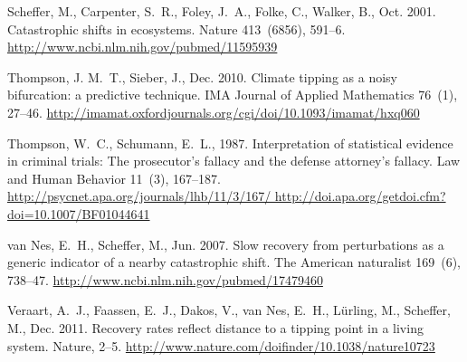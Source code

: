 \documentclass[authoryear,review,12pt]{elsarticle}
\begin{document}
\begin{thebibliography}{24}
Scheffer, M., Carpenter, S.~R., Foley, J.~A., Folke, C., Walker, B., Oct. 2001.
  {Catastrophic shifts in ecosystems.} Nature 413~(6856), 591--6.
\newline\urlprefix\url{http://www.ncbi.nlm.nih.gov/pubmed/11595939}

Thompson, J. M.~T., Sieber, J., Dec. 2010. {Climate tipping as a noisy
  bifurcation: a predictive technique}. IMA Journal of Applied Mathematics
  76~(1), 27--46.
\newline\urlprefix\url{http://imamat.oxfordjournals.org/cgi/doi/10.1093/imamat/hxq060}

Thompson, W.~C., Schumann, E.~L., 1987. {Interpretation of statistical evidence
  in criminal trials: The prosecutor's fallacy and the defense attorney's
  fallacy.} Law and Human Behavior 11~(3), 167--187.
\newline\urlprefix\url{http://psycnet.apa.org/journals/lhb/11/3/167/
  http://doi.apa.org/getdoi.cfm?doi=10.1007/BF01044641}

van Nes, E.~H., Scheffer, M., Jun. 2007. {Slow recovery from perturbations as a
  generic indicator of a nearby catastrophic shift.} The American naturalist
  169~(6), 738--47.
\newline\urlprefix\url{http://www.ncbi.nlm.nih.gov/pubmed/17479460}

Veraart, A.~J., Faassen, E.~J., Dakos, V., van Nes, E.~H., L\"{u}rling, M.,
  Scheffer, M., Dec. 2011. {Recovery rates reflect distance to a tipping point
  in a living system}. Nature, 2--5.
\newline\urlprefix\url{http://www.nature.com/doifinder/10.1038/nature10723}

\end{thebibliography}
 
 
\end{document}
